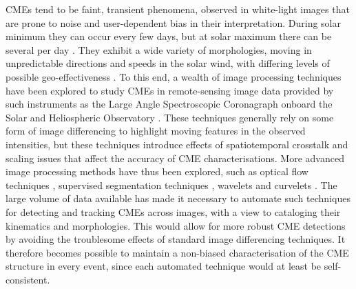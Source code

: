 \documentclass[referee,a4paper,12pt,traditabstract]{swsc}
\begin{document}
\begin{linenumbers}
CMEs tend to be faint, transient phenomena, observed in white-light images that are prone to noise and user-dependent bias in their interpretation. During solar minimum they can occur every few days, but at solar maximum there can be several per day \citep{2000JGR...10518169S, 2004JGRA..10907105Y}. They exhibit a wide variety of morphologies, moving in unpredictable directions and speeds in the solar wind, with differing levels of possible geo-effectiveness \citep{2001JASTP..63..389P, 2005AnGeo..23.1033S, 2009GeoRL..3608102D, 2012SoPh..tmp...47L}. To this end, a wealth of image processing techniques have been explored to study CMEs in remote-sensing image data provided by such instruments as the Large Angle Spectroscopic Coronagraph \citep[LASCO;][]{1995SoPh..162..357B} onboard the Solar and Heliospheric Observatory \citep[SOHO;][]{1995SoPh..162....1D}. These techniques generally rely on some form of image differencing to highlight moving features in the observed intensities, but these techniques introduce effects of spatiotemporal crosstalk and scaling issues that affect the accuracy of CME characterisations. More advanced image processing methods have thus been explored, such as optical flow techniques \citep{2006ApJ...652.1747C}, supervised segmentation techniques \citep{Goussies:2010:DTC:1749630.1750150}, wavelets \citep{2003A&A...398.1185S} and curvelets \citep{2011AdSpR..47.2118G}. The large volume of data available has made it necessary to automate such techniques for detecting and tracking CMEs across images, with a view to cataloging their kinematics and morphologies. This would allow for more robust CME detections by avoiding the troublesome effects of standard image differencing techniques. It therefore becomes possible to maintain a non-biased characterisation of the CME structure in every event, since each automated technique would at least be self-consistent.


\end{linenumbers}
\end{document}
